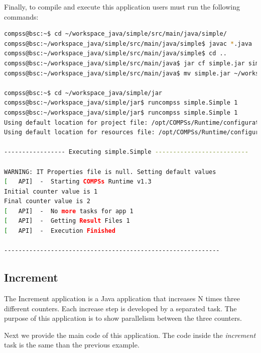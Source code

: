 Finally, to compile and execute this application users must run the following commands:

\begin{lstlisting}[language=bash]
compss@bsc:~$ cd ~/workspace_java/simple/src/main/java/simple/
compss@bsc:~/workspace_java/simple/src/main/java/simple$ javac *.java
compss@bsc:~/workspace_java/simple/src/main/java/simple$ cd ..
compss@bsc:~/workspace_java/simple/src/main/java$ jar cf simple.jar simple
compss@bsc:~/workspace_java/simple/src/main/java$ mv simple.jar ~/workspace_java/simple/jar/

compss@bsc:~$ cd ~/workspace_java/simple/jar
compss@bsc:~/workspace_java/simple/jar$ runcompss simple.Simple 1
compss@bsc:~/workspace_java/simple/jar$ runcompss simple.Simple 1
Using default location for project file: /opt/COMPSs/Runtime/configuration/xml/projects/project.xml
Using default location for resources file: /opt/COMPSs/Runtime/configuration/xml/resources/resources.xml

----------------- Executing simple.Simple --------------------------

WARNING: IT Properties file is null. Setting default values
[   API]  -  Starting COMPSs Runtime v1.3
Initial counter value is 1
Final counter value is 2
[   API]  -  No more tasks for app 1
[   API]  -  Getting Result Files 1
[   API]  -  Execution Finished

------------------------------------------------------------
\end{lstlisting}


\subsection{Increment}
The Increment application is a Java application that increases N times three different counters. Each increase step is developed by a separated task. The
purpose of this application is to show parallelism between the three counters.

Next we provide the main code of this application. The code inside the \textit{increment} task is the same than the previous example. 

